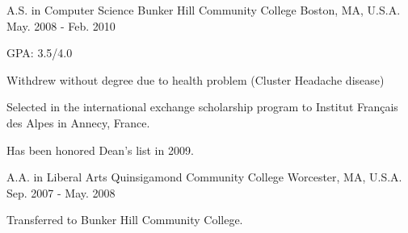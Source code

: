\begin{cventries}
  \cventry
    {A.S. in Computer Science} %
    {Bunker Hill Community College} %
    {Boston, MA, U.S.A.} %
    {May. 2008 - Feb. 2010} %
    {
      \begin{cvitems} %
        \item {GPA: 3.5/4.0}
        \item {Withdrew without degree due to health problem (Cluster Headache disease)}
        \item {Selected in the international exchange scholarship program to Institut Français des Alpes in Annecy, France.}
        \item {Has been honored Dean's list in 2009.}
      \end{cvitems}
    }

  \cventry
    {A.A. in Liberal Arts} %
    {Quinsigamond Community College} %
    {Worcester, MA, U.S.A.} %
    {Sep. 2007 - May. 2008} %
    {
      \begin{cvitems} %
        \item {Transferred to Bunker Hill Community College.}
      \end{cvitems}
    }

\end{cventries}
